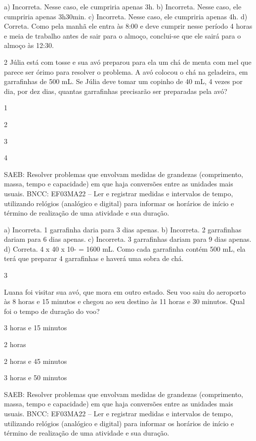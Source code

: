 a) Incorreta. Nesse caso, ele cumpriria apenas 3h.
b) Incorreta. Nesse caso, ele cumpriria apenas 3h30min.
c) Incorreta. Nesse caso, ele cumpriria apenas 4h.
d) Correta. Como pela manhã ele entra às 8:00 e deve cumprir nesse período 4 horas e
meia de trabalho antes de sair para o almoço, conclui-se que ele sairá para o almoço às 12:30.

\num{2} Júlia está com tosse e sua avó preparou para ela um chá de menta com mel que parece ser órimo para resolver o problema. A avó colocou o chá na geladeira, em garrafinhas de 500 mL. Se Júlia deve tomar um copinho de 40 mL, 4 vezes por dia, por dez dias, quantas garrafinhas precisarão ser preparadas pela avó?

\begin{escolha}

\item
  1
\item
  2
\item
  3
\item
  4
\end{escolha}

SAEB: Resolver problemas que envolvam medidas de grandezas (comprimento, massa, tempo e capacidade) em que haja conversões entre as unidades mais usuais. 
BNCC: EF03MA22 -- Ler e registrar medidas e intervalos de tempo, utilizando relógios (analógico e
digital) para informar os horários de início e término de realização de uma atividade e sua
duração.

a) Incorreta. 1 garrafinha daria para 3 dias apenas.
b) Incorreta. 2 garrafinhas dariam para 6 dias apenas.
c) Incorreta. 3 garrafinhas dariam para 9 dias apenas.
d) Correta. 4 x 40 x 10- = 1600 mL. Como cada garrafinha contém 500 mL, ela terá que
preparar 4 garrafinhas e haverá uma sobra de chá.

\num{3}

Luana foi visitar sua avó, que mora em outro estado. Seu voo
saiu do aeroporto às 8 horas e 15 minutos e chegou ao seu destino às 11
horas e 30 minutos. Qual foi o tempo de duração do voo?

\begin{escolha}

\item
  3 horas e 15 minutos
\item
  2 horas 
\item
  2 horas e 45 minutos
\item
  3 horas e 50 minutos
\end{escolha}

SAEB: Resolver problemas que envolvam medidas de grandezas (comprimento, massa, tempo e capacidade) em que haja conversões entre as unidades mais usuais. 
BNCC: EF03MA22 -- Ler e registrar medidas e intervalos de tempo, utilizando relógios (analógico e
digital) para informar os horários de início e término de realização de uma atividade e sua
duração.

